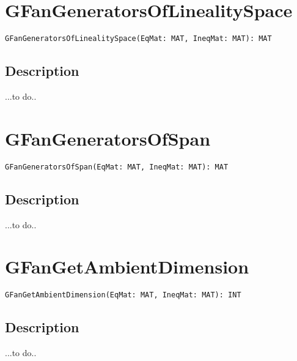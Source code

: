 \documentclass[a4paper]{mybook}
\newenvironment{command}{}{} %
\begin{document}
\section{GFanGeneratorsOfLinealitySpace}
\label{GFanGeneratorsOfLinealitySpace}
\begin{command} %


\begin{Verbatim}[label=syntax, rulecolor=\color{MidnightBlue},
frame=single]
GFanGeneratorsOfLinealitySpace(EqMat: MAT, IneqMat: MAT): MAT
\end{Verbatim}


\subsection*{Description}

...to do..

\end{command} %

\section{GFanGeneratorsOfSpan}
\label{GFanGeneratorsOfSpan}
\begin{command} %


\begin{Verbatim}[label=syntax, rulecolor=\color{MidnightBlue},
frame=single]
GFanGeneratorsOfSpan(EqMat: MAT, IneqMat: MAT): MAT
\end{Verbatim}


\subsection*{Description}

...to do..

\end{command} %

\section{GFanGetAmbientDimension}
\label{GFanGetAmbientDimension}
\begin{command} %


\begin{Verbatim}[label=syntax, rulecolor=\color{MidnightBlue},
frame=single]
GFanGetAmbientDimension(EqMat: MAT, IneqMat: MAT): INT
\end{Verbatim}


\subsection*{Description}

...to do..

\end{command} %
\end{document}
